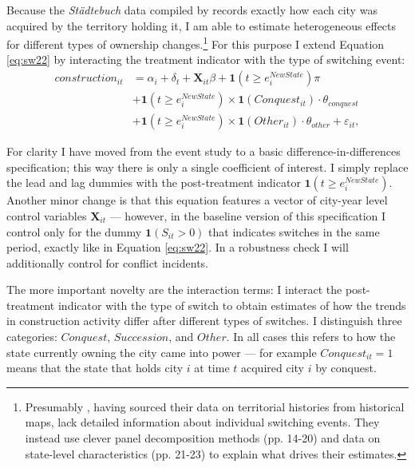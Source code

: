 \documentclass[11pt, a4paper]{article}
\begin{document}
Because the \textit{Städtebuch} data compiled by \cite{pt2} records exactly how each city was acquired by the territory holding it, I am able to estimate heterogeneous effects for different types of ownership changes.\footnote
{
Presumably \cite{schoenholzer2022}, having sourced their data on territorial histories from historical maps, lack detailed information about individual switching events. They instead use clever panel decomposition methods (pp. 14-20) and data on state-level characteristics (pp. 21-23) to explain what drives their estimates.
}
For this purpose I extend Equation \eqref{eq:sw22} by interacting the treatment indicator with the type of switching event:
\begin{equation}
\label{eq:baseline}
\begin{split}
    construction_{it} &= \alpha_i + \delta_t + \mathbf{X}_{it} \beta + 
    \mathbf{1}(t \ge e^{NewState}_i) \pi \\
    &+ \mathbf{1}(t \ge e^{NewState}_i) \times
    \mathbf{1}(Conquest_{it}) \cdot \theta_{conquest} \\
    &+ \mathbf{1}(t \ge e^{NewState}_i) \times
    \mathbf{1}(Other_{it}) \cdot \theta_{other} + \varepsilon_{it},
\end{split}
\end{equation}

For clarity I have moved from the event study to a basic difference-in-differences specification; this way there is only a single coefficient of interest. I simply replace the lead and lag dummies with the post-treatment indicator $\mathbf{1}(t \ge e^{NewState}_i)$. Another minor change is that this equation features a vector of city-year level control variables $\mathbf{X}_{it}$ --- however, in the baseline version of this specification I control only for the dummy $\mathbf{1}(S_{it} > 0)$ that indicates switches in the same period, exactly like in Equation \eqref{eq:sw22}. In a robustness check I will additionally control for conflict incidents.

The more important novelty are the interaction terms: I interact the post-treatment indicator with the type of switch to obtain estimates of how the trends in construction activity differ after different types of switches. I distinguish three categories: $Conquest$, $Succession$, and $Other$. In all cases this refers to how the state currently owning the city came into power --- for example $Conquest_{it} = 1$ means that the state that holds city $i$ at time $t$ acquired city $i$ by conquest.
\end{document}
